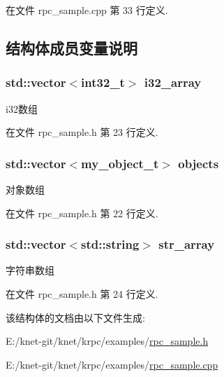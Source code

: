 在文件 rpc\+\_\+sample.\+cpp 第 33 行定义.



\subsection{结构体成员变量说明}
\hypertarget{structrpc__sample_1_1my__object__other__t_aac16f58d6e1fac3e520e9a30b73bc312}{}
\subsubsection[{i32\+\_\+array}]{\setlength{\rightskip}{0pt plus 5cm}std\+::vector$<$int32\+\_\+t$>$ i32\+\_\+array}\label{structrpc__sample_1_1my__object__other__t_aac16f58d6e1fac3e520e9a30b73bc312}


i32数组 



在文件 rpc\+\_\+sample.\+h 第 23 行定义.

\hypertarget{structrpc__sample_1_1my__object__other__t_aefa08182691a0dffb9e0bdad6a50b421}{}
\subsubsection[{objects}]{\setlength{\rightskip}{0pt plus 5cm}std\+::vector$<${\bf my\+\_\+object\+\_\+t}$>$ objects}\label{structrpc__sample_1_1my__object__other__t_aefa08182691a0dffb9e0bdad6a50b421}


对象数组 



在文件 rpc\+\_\+sample.\+h 第 22 行定义.

\hypertarget{structrpc__sample_1_1my__object__other__t_a5270a6498aa55551693b9a5e077dfbfc}{}
\subsubsection[{str\+\_\+array}]{\setlength{\rightskip}{0pt plus 5cm}std\+::vector$<$std\+::string$>$ str\+\_\+array}\label{structrpc__sample_1_1my__object__other__t_a5270a6498aa55551693b9a5e077dfbfc}


字符串数组 



在文件 rpc\+\_\+sample.\+h 第 24 行定义.



该结构体的文档由以下文件生成\+:\begin{DoxyCompactItemize}
\item 
E\+:/knet-\/git/knet/krpc/examples/\hyperlink{rpc__sample_8h}{rpc\+\_\+sample.\+h}\item 
E\+:/knet-\/git/knet/krpc/examples/\hyperlink{rpc__sample_8cpp}{rpc\+\_\+sample.\+cpp}\end{DoxyCompactItemize}

